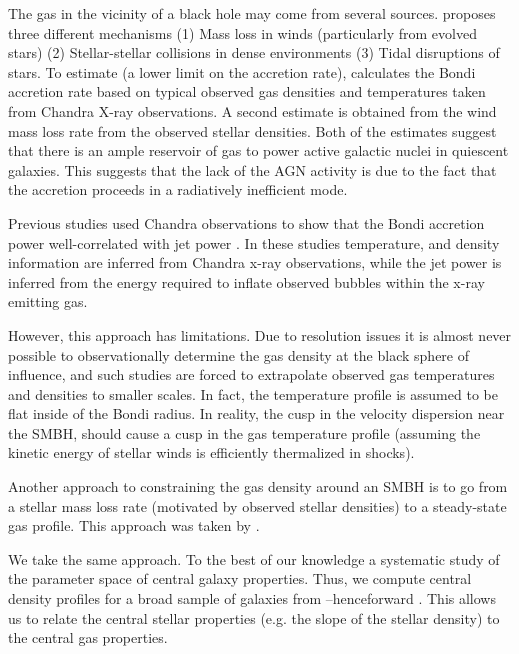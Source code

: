 \documentclass[usenatbib,fleqn]{mn2e}
\begin{document}
The gas in the vicinity of a black hole may come from several
sources. \citealt{Ho:2009a} proposes three different mechanisms (1)
Mass loss in winds (particularly from evolved stars) (2)
Stellar-stellar collisions in dense environments (3) Tidal disruptions
of stars. To estimate (a lower limit on the accretion rate),
\citealt{Ho:2009a} calculates the Bondi accretion rate based on
typical observed gas densities and temperatures taken from Chandra
X-ray observations. A second estimate is obtained from the wind mass
loss rate from the observed stellar densities. Both of the estimates
suggest that there is an ample reservoir of gas to power active
galactic nuclei in quiescent galaxies. This suggests that the lack of
the AGN activity is due to the fact that the accretion proceeds in a
radiatively inefficient mode.

Previous studies used Chandra observations to show that the Bondi
accretion power well-correlated with jet power
\citep{AllenDunn+:2006a,FujitaKawakatu+:2014a}. In these studies
temperature, and density information are inferred from Chandra x-ray
observations, while the jet power is inferred from the energy required
to inflate observed bubbles within the x-ray emitting gas.

However, this approach has limitations. Due to resolution issues it is
almost never possible to observationally determine the gas density at
the black sphere of influence, and such studies are forced to
extrapolate observed gas temperatures and densities to smaller scales.
In fact, the temperature profile is assumed to be flat inside of the
Bondi radius.  In reality, the cusp in the velocity dispersion near
the SMBH, should cause a cusp in the gas temperature profile (assuming
the kinetic energy of stellar winds is efficiently thermalized in
shocks).

Another approach to constraining the gas density around an SMBH is to
go from a stellar mass loss rate (motivated by observed stellar
densities) to a steady-state gas profile. This approach was taken by
\citealt{Quataert:2004a,De-ColleGuillochon+:2012a,ShcherbakovWong+:2014a}.

We take the same approach. To the best of our knowledge a systematic
study of the parameter space of central galaxy properties. Thus, we
compute central density profiles for a broad sample of galaxies from
\citealt{WangMerritt:2004a}--henceforward
.  This allows us to relate the central
stellar properties (e.g. the slope of the stellar density) to the
central gas properties.
\end{document}
